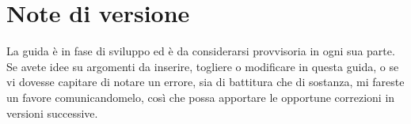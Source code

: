 
{}
\section*{Note di versione}

La guida è in fase di sviluppo ed è da considerarsi provvisoria in ogni sua parte. Se avete idee su argomenti da inserire, togliere o modificare in questa guida, o se vi dovesse capitare di notare un errore, sia di battitura che di sostanza, mi fareste un favore comunicandomelo, così che possa apportare le opportune correzioni in versioni successive.